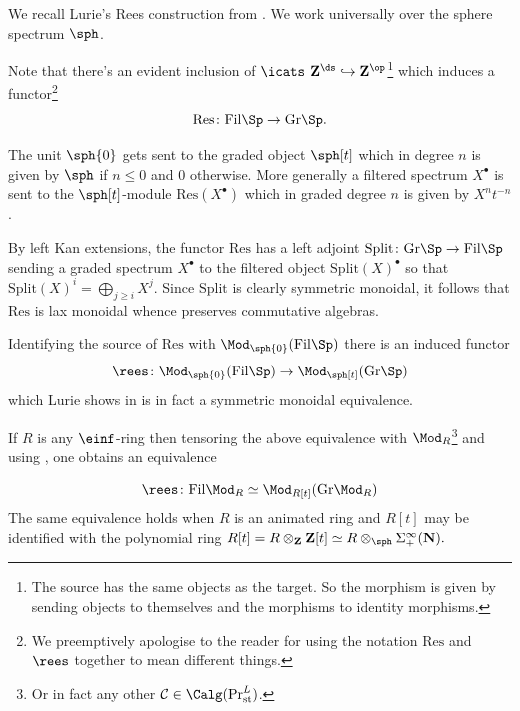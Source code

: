 \documentclass[10pt,reqno]{amsart}
\numberwithin{equation}{section}
\newcommand{\cC}{\mathcal{C}}
\newcommand{\ZZ}{\mathbf{Z}}
\newcommand{\Gr}{\mathrm{Gr}}
\newcommand{\fil}{\mathrm{Fil}}
\newcommand{\into}{\hookrightarrow}
\newcommand{\st}{\mathrm{st}}
\newcommand{\res}{\mathrm{Res}}
\newcommand{\splt}{\mathrm{Split}}
\begin{document}
\begin{recollection}\label{rec: luries rees construction} We recall Lurie's Rees construction from  \cite[3.1]{Lurie2015RotationInvarianceKTheory}. We work universally over the sphere spectrum $\sph$.  

Note that there's an evident inclusion of $\icats$ $\ZZ^\ds\into \ZZ^\op$\footnote{The source has the same objects as the target. So the morphism is given by sending objects to themselves and the morphisms to identity morphisms.} which induces a functor\footnote{We preemptively apologise to the reader for using the notation $\res$ and $\rees$ together to mean different things.} $$\res\colon \fil\Sp\to \Gr\Sp.$$

The unit $\sph\{0\}$ gets sent to the graded object $\sph[t]$ which in degree $n$ is given by $\sph$ if $n\leq 0$ and $0$ otherwise. More generally a filtered spectrum $X^\bullet$ is sent to the $\sph[t]$-module $\mathrm{Res}(X^\bullet)$ which in graded degree $n$ is given by $X^nt^{-n}$. 

By left Kan extensions, the functor $\res$ has a left adjoint $\splt\colon \Gr\Sp\to \fil\Sp$ sending a graded spectrum $X^\bullet$ to the filtered object $\splt(X)^\bullet$ so that $\splt(X)^i=\bigoplus_{j\geq i} X^j.$ Since $\splt$ is clearly symmetric monoidal, it follows that $\res$ is lax monoidal whence preserves commutative algebras. 

Identifying the source of $\res$ with $\Mod_{\sph\{0\}}(\fil\Sp)$ there is an induced functor $$\rees\colon \Mod_{\sph\{0\}}(\fil\Sp)\to \Mod_{\sph[t]}(\Gr\Sp)$$ which Lurie shows in \cite[Proposition 3.1.6]{Lurie2015RotationInvarianceKTheory} is in fact a symmetric monoidal equivalence.


If $R$ is any $\einf$-ring then tensoring the above equivalence with $\Mod_R$\footnote{Or in fact any other $\cC\in \Calg(\Pr^L_{\st})$.} and using \cite[Theorem 4.8.5.16]{HA}, one obtains an equivalence

\begin{equation}\label{eq: rees at filgraded}
  \rees\colon \fil\Mod_R\simeq \Mod_{R[t]}(\Gr\Mod_R)  
\end{equation}
The same equivalence holds when $R$ is an animated ring and $R[t]$ may be identified with the polynomial ring $R[t]=R\otimes_{\ZZ}\ZZ[t]\simeq R\otimes_{\sph} \Sigma_{+}^\infty(\mathbf{N}).$

\end{recollection}
\end{document}
